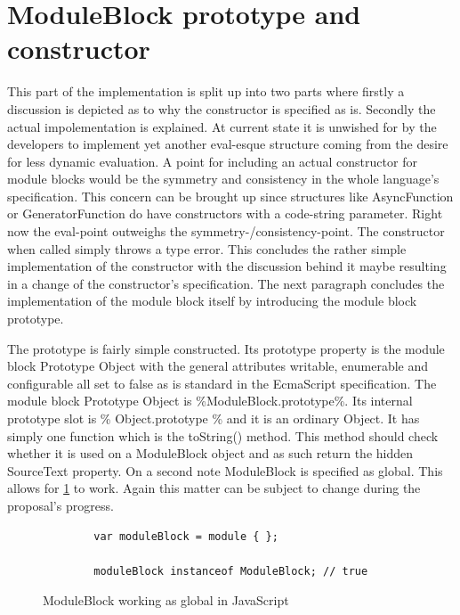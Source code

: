 \section{ModuleBlock prototype and constructor}

This part of the implementation is split up into two parts where firstly a discussion is depicted as to why the constructor is specified as is. Secondly the actual impolementation is explained. At current state it is unwished for by the developers to implement yet another eval-esque structure coming from the desire for less dynamic evaluation. A point for including an actual constructor for module blocks would be the symmetry and consistency in the whole language's specification. This concern can be brought up since structures like AsyncFunction or GeneratorFunction do have constructors with a code-string parameter. Right now the eval-point outweighs the symmetry-/consistency-point. The constructor when called simply throws a type error. This concludes the rather simple implementation of the constructor with the discussion behind it maybe resulting in a change of the constructor's specification. The next paragraph concludes the implementation of the module block itself by introducing the module block prototype.

The prototype is fairly simple constructed. Its prototype property is the module block Prototype Object with the general attributes writable, enumerable and configurable all set to false as is standard in the EcmaScript specification. The module block Prototype Object is \%ModuleBlock.prototype\%. Its internal prototype slot is \% Object.prototype \% and it is an ordinary Object. It has simply one function which is the toString() method. This method should check whether it is used on a ModuleBlock object and as such return the hidden SourceText property.
On a second note ModuleBlock is specified as global. This allows for \ref{lst:impl:globModule} to work. Again this matter can be subject to change during the proposal's progress.

\begin{figure}[h!]
    \begin{lstlisting}
        var moduleBlock = module { };
        
        moduleBlock instanceof ModuleBlock; // true
    \end{lstlisting}
    \caption{ModuleBlock working as global in JavaScript}
    \label{lst:impl:globModule}
\end{figure}

